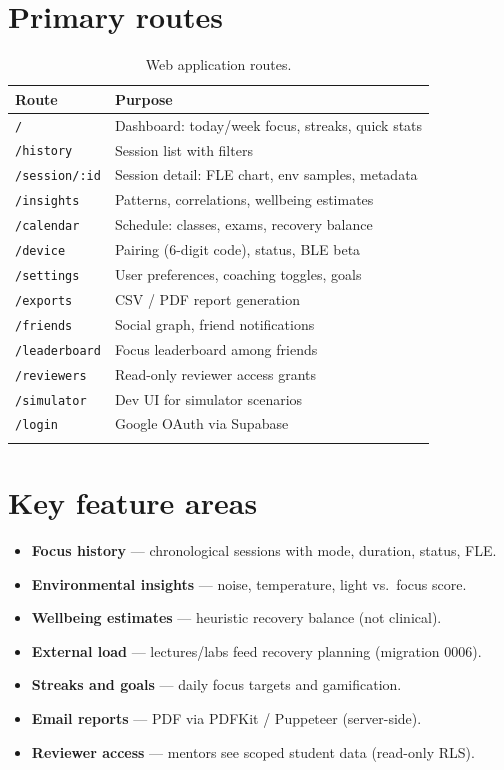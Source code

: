 \documentclass[11pt,a4paper]{report}
\begin{document}
\section{Primary routes}

\begin{longtable}{@{}p{2.8cm}p{9.8cm}@{}}
\toprule
\textbf{Route} & \textbf{Purpose} \\
\midrule
\endhead
\texttt{/} & Dashboard: today/week focus, streaks, quick stats \\
\texttt{/history} & Session list with filters \\
\texttt{/session/:id} & Session detail: FLE chart, env samples, metadata \\
\texttt{/insights} & Patterns, correlations, wellbeing estimates \\
\texttt{/calendar} & Schedule: classes, exams, recovery balance \\
\texttt{/device} & Pairing (6-digit code), status, BLE beta \\
\texttt{/settings} & User preferences, coaching toggles, goals \\
\texttt{/exports} & CSV / PDF report generation \\
\texttt{/friends} & Social graph, friend notifications \\
\texttt{/leaderboard} & Focus leaderboard among friends \\
\texttt{/reviewers} & Read-only reviewer access grants \\
\texttt{/simulator} & Dev UI for simulator scenarios \\
\texttt{/login} & Google OAuth via Supabase \\
\bottomrule
\caption{Web application routes.}
\end{longtable}

\section{Key feature areas}

\begin{itemize}[leftmargin=*]
  \item \textbf{Focus history} --- chronological sessions with mode, duration, status, FLE.
  \item \textbf{Environmental insights} --- noise, temperature, light vs.\ focus score.
  \item \textbf{Wellbeing estimates} --- heuristic recovery balance (not clinical).
  \item \textbf{External load} --- lectures/labs feed recovery planning (migration 0006).
  \item \textbf{Streaks and goals} --- daily focus targets and gamification.
  \item \textbf{Email reports} --- PDF via PDFKit / Puppeteer (server-side).
  \item \textbf{Reviewer access} --- mentors see scoped student data (read-only RLS).
\end{itemize}
\end{document}
